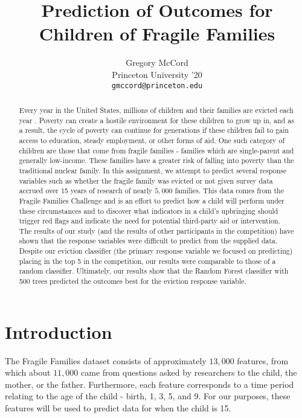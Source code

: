 \documentclass{article} %
\title{Prediction of Outcomes for Children of Fragile Families}
\author{
Gregory McCord \\
Princeton University '20 \\
\texttt{gmccord@princeton.edu} \\
}
\begin{document}
\maketitle

\begin{abstract}

Every year in the United States, millions of children and their families are evicted each year \cite{evic}. Poverty can create a hostile environment for these children to grow up in, and as a result, the cycle of poverty can continue for generations if these children fail to gain access to education, steady employment, or other forms of aid. One such category of children are those that come from fragile families - families which are single-parent and generally low-income. These families have a greater risk of falling into poverty than the traditional nuclear family. In this assignment, we attempt to predict several response variables such as whether the fragile family was evicted or not given survey data accrued over 15 years of research of nearly $5,000$ families. This data comes from the Fragile Families Challenge and is an effort to predict how a child will perform under these circumstances and to discover what indicators in a child's upbringing should trigger red flags and indicate the need for potential third-party aid or intervention. The results of our study (and the results of other participants in the competition) have shown that the response variables were difficult to predict from the supplied data. Despite our eviction classifier (the primary response variable we focused on predicting) placing in the top 5 in the competition, our results were comparable to those of a random classifier. Ultimately, our results show that the Random Forest classifier with 500 trees predicted the outcomes best for the eviction response variable.

\end{abstract}

\section{Introduction}

The Fragile Families dataset consists of approximately $13,000$ features, from which about $11,000$ came from questions asked by researchers to the child, the mother, or the father. Furthermore, each feature corresponds to a time period relating to the age of the child - birth, 1, 3, 5, and 9. For our purposes, these features will be used to predict data for when the child is 15.
\end{document}

